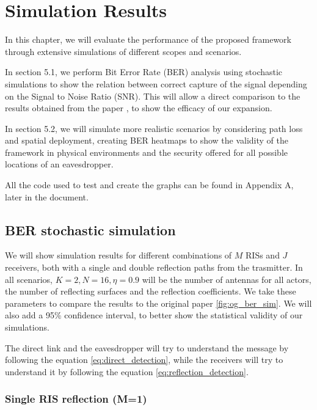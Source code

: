 \section{Simulation Results}

In this chapter, we will evaluate the performance of the proposed framework through extensive simulations of different scopes and scenarios.

In section 5.1, we perform Bit Error Rate (BER) analysis using stochastic simulations to show the relation between correct capture of the signal depending on the Signal to Noise Ratio (SNR). This will allow a direct comparison to the results obtained from the paper \cite{9328149}, to show the efficacy of our expansion.

In section 5.2, we will simulate more realistic scenarios by considering path loss and spatial deployment, creating BER heatmaps to show the validity of the framework in physical environments and the security offered for all possible locations of an eavesdropper.

All the code used to test and create the graphs can be found in Appendix A, later in the document.

\subsection{BER stochastic simulation}

We will show simulation results for different combinations of $M$ RISs and $J$ receivers, both with a single and double reflection paths from the trasmitter. In all scenarios, $K = 2, N = 16, \eta = 0.9$ will be the number of antennas for all actors, the number of reflecting surfaces and the reflection coefficients. We take these parameters to compare the results to the original paper \cite{9328149} \cref{fig:og_ber_sim}. We will also add a 95\% confidence interval, to better show the statistical validity of our simulations.

The direct link and the eavesdropper will try to understand the message by following the equation \eqref{eq:direct_detection}, while the receivers will try to understand it by following the equation \eqref{eq:reflection_detection}.

\subsubsection{Single RIS reflection (M=1)}


